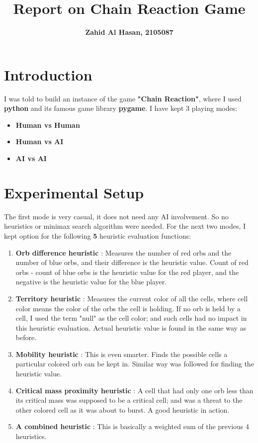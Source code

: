 \documentclass[a4paper, 13pt]{article}
\title{\textbf{\Large{Report on Chain Reaction Game}}}
\author{\textbf{Zahid Al Hasan, 2105087}}
\date{}
\begin{document}
	
	\maketitle
	\vspace{0.4cm}
	\section*{Introduction}	
	
	I was told to build an instance of the game \textbf{"Chain Reaction"}, where I used \textbf{python} and its famous game library \textbf{pygame}. I have kept 3 playing modes:
		\begin{itemize}
			\item \textbf{Human vs Human}
			\item \textbf{Human vs AI}
			\item \textbf{AI vs AI}
		\end{itemize}
		
	\vspace{0.5cm}
	\section*{Experimental Setup}
	
	The first mode is very casual, it does not need any AI involvement. So no heuristics or minimax search algorithm were needed. For the	next two modes, I kept option for the following \textbf{5} heuristic evaluation functions:
	\begin{enumerate}
		\item \textbf{Orb difference heuristic} : 
		Measures the number of red orbs and the number of blue orbs, and their difference is the heuristic value. Count of red orbs - count of blue orbs is the heuristic value for the red player, and the negative is the heuristic value for the blue player.
		
		\item \textbf{Territory heuristic} : 
		Measures the current color of all the cells, where cell color means the color of the orbs the cell is holding. If no orb is held by a cell, I used the term "null" as the cell color; and such cells had no impact in this heuristic evaluation. Actual heuristic value is found in the same way as before.
		
		\item \textbf{Mobility heuristic} : 
		This is even smarter. Finds the possible cells a particular colored orb can be kept in. Similar way was followed for finding the heuristic value.
		
		\item \textbf{Critical mass proximity heuristic} : 
		A cell that had only one orb less than its critical mass was supposed to be a critical cell; and was a threat to the other colored cell as it was about to burst. A good heuristic in action.
		
		\item \textbf{A combined heuristic} : 
		This is basically a weighted sum of the previous 4 heuristics.
	\end{enumerate}
	
\end{document}
